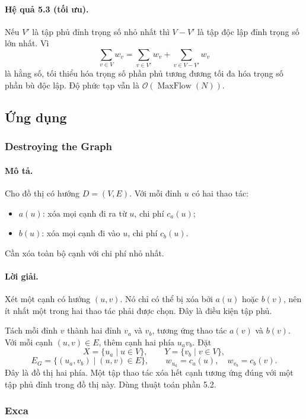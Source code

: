 \documentclass[11pt]{article}
\newcommand{\Oh}{\mathcal{O}}
\begin{document}
\paragraph{Hệ quả 5.3 (tối ưu).}
Nếu \(V'\) là tập phủ đỉnh trọng số nhỏ nhất thì \(V-V'\) là tập độc lập đỉnh
trọng số lớn nhất. Vì
\[
  \sum_{v\in V}w_v=\sum_{v\in V'}w_v+\sum_{v\in V-V'}w_v
\]
là hằng số, tối thiểu hóa trọng số phần phủ tương đương tối đa hóa trọng số
phần bù độc lập. Độ phức tạp vẫn là \(\Oh(\operatorname{MaxFlow}(N))\).

\subsection{Ứng dụng}

\subsubsection{Destroying the Graph}

\paragraph{Mô tả.}
Cho đồ thị có hướng \(D=(V,E)\). Với mỗi đỉnh \(u\) có hai thao tác:
\begin{itemize}
  \item \(a(u)\): xóa mọi cạnh đi ra từ \(u\), chi phí \(c_a(u)\);
  \item \(b(u)\): xóa mọi cạnh đi vào \(u\), chi phí \(c_b(u)\).
\end{itemize}
Cần xóa toàn bộ cạnh với chi phí nhỏ nhất.

\paragraph{Lời giải.}
Xét một cạnh có hướng \((u,v)\). Nó chỉ có thể bị xóa bởi \(a(u)\) hoặc
\(b(v)\), nên ít nhất một trong hai thao tác phải được chọn. Đây là điều kiện
tập phủ.

Tách mỗi đỉnh \(v\) thành hai đỉnh \(v_a\) và \(v_b\), tương ứng thao tác
\(a(v)\) và \(b(v)\). Với mỗi cạnh \((u,v)\in E\), thêm cạnh hai phía
\(u_a v_b\). Đặt
\[
  X=\{u_a\mid u\in V\},\qquad
  Y=\{v_b\mid v\in V\},
\]
\[
  E_G=\{(u_a,v_b)\mid (u,v)\in E\},\qquad
  w_{u_a}=c_a(u),\quad w_{v_b}=c_b(v).
\]
Đây là đồ thị hai phía. Một tập thao tác xóa hết cạnh tương ứng đúng với một
tập phủ đỉnh trong đồ thị này. Dùng thuật toán phần 5.2.

\subsubsection{Exca}
\end{document}
